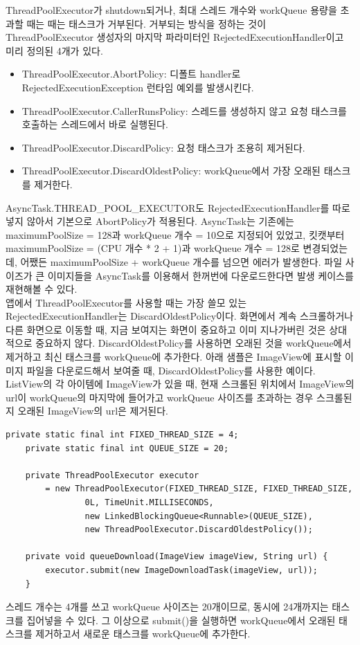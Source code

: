 ThreadPoolExecutor가 shutdown되거나, 최대 스레드 개수와 workQueue 용량을 초과할 때는 때는 태스크가 거부된다. 거부되는 방식을 정하는 것이 ThreadPoolExecutor 생성자의 마지막 파라미터인 RejectedExecutionHandler이고 미리 정의된 4개가 있다.
\begin{itemize}
\item ThreadPoolExecutor.AbortPolicy: 디폴트 handler로 RejectedExecutionException 런타임 예외를 발생시킨다.
\item ThreadPoolExecutor.CallerRunsPolicy: 스레드를 생성하지 않고 요청 태스크를 호출하는 스레드에서 바로 실행된다. 
\item ThreadPoolExecutor.DiscardPolicy: 요청 태스크가 조용히 제거된다.
\item ThreadPoolExecutor.DiscardOldestPolicy: workQueue에서 가장 오래된 태스크를 제거한다.
\end{itemize}

AsyncTask.THREAD\_POOL\_EXECUTOR도 RejectedExecutionHandler를 따로 넣지 않아서 기본으로 AbortPolicy가 적용된다. AsyncTask는 기존에는 maximumPoolSize = 128과 workQueue 개수 = 10으로 지정되어 있었고, 킷캣부터 maximumPoolSize = (CPU 개수 * 2 + 1)과 workQueue 개수 = 128로 변경되었는데, 어쨌든 maximumPoolSize + workQueue 개수를 넘으면 에러가 발생한다. 파일 사이즈가 큰 이미지들을 AsyncTask를 이용해서 한꺼번에 다운로드한다면 발생 케이스를 재현해볼 수 있다.\\

앱에서 ThreadPoolExecutor를 사용할 때는 가장 쓸모 있는 RejectedExecutionHandler는 DiscardOldestPolicy이다. 
화면에서 계속 스크롤하거나 다른 화면으로 이동할 때, 지금 보여지는 화면이 중요하고 이미 지나가버린 것은 상대적으로 중요하지 않다. 
DiscardOldestPolicy를 사용하면 오래된 것을 workQueue에서 제거하고 최신 태스크를 workQueue에 추가한다. 
아래 샘플은 ImageView에 표시할 이미지 파일을 다운로드해서 보여줄 때, DiscardOldestPolicy를 사용한 예이다.
ListView의 각 아이템에 ImageView가 있을 때, 현재 스크롤된 위치에서 ImageView의 url이 workQueue의 마지막에 들어가고 workQueue 사이즈를 초과하는 경우 스크롤된 지 오래된 ImageView의 url은 제거된다.
\begin{lstlisting}[frame=single] 
	private static final int FIXED_THREAD_SIZE = 4;
	private static final int QUEUE_SIZE = 20;
	
	private ThreadPoolExecutor executor
		= new ThreadPoolExecutor(FIXED_THREAD_SIZE, FIXED_THREAD_SIZE, 
				0L, TimeUnit.MILLISECONDS, 
				new LinkedBlockingQueue<Runnable>(QUEUE_SIZE), 
				new ThreadPoolExecutor.DiscardOldestPolicy());
	
	private void queueDownload(ImageView imageView, String url) {
		executor.submit(new ImageDownloadTask(imageView, url));
	}
\end{lstlisting}
스레드 개수는 4개를 쓰고 workQueue 사이즈는 20개이므로, 동시에 24개까지는 태스크를 집어넣을 수 있다. 그 이상으로 submit()을 실행하면 workQueue에서 오래된 태스크를 제거하고서 새로운 태스크를 workQueue에 추가한다.\\
	
